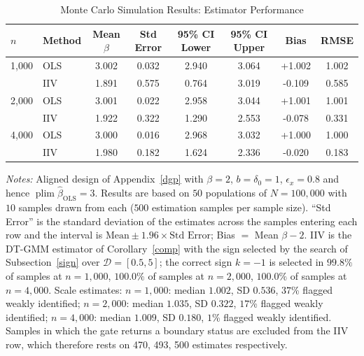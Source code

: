 \begin{table}[htbp]
\centering
\caption{Monte Carlo Simulation Results: Estimator Performance}
\label{tab:simulation_results}
\begin{threeparttable}
\begin{tabular}{llcccccc}
\toprule
\(n\) & Method & Mean \(\beta\) & Std Error & 95\% CI Lower & 95\% CI Upper & Bias & RMSE \\
\midrule
1{,}000 & OLS  & 3.002 & 0.032 & 2.940 & 3.064 & +1.002 & 1.002 \\
        & IIV  & 1.891 & 0.575 & 0.764 & 3.019 & -0.109 & 0.585 \\
\midrule
2{,}000 & OLS  & 3.001 & 0.022 & 2.958 & 3.044 & +1.001 & 1.001 \\
        & IIV  & 1.922 & 0.322 & 1.290 & 2.553 & -0.078 & 0.331 \\
\midrule
4{,}000 & OLS  & 3.000 & 0.016 & 2.968 & 3.032 & +1.000 & 1.000 \\
        & IIV  & 1.980 & 0.182 & 1.624 & 2.336 & -0.020 & 0.183 \\
\bottomrule
\end{tabular}
\begin{tablenotes}
\small
\item \textit{Notes:} Aligned design of Appendix~\ref{dgp} with
\(\beta=2\), \(b=\delta_0=1\), \(\epsilon_x=0.8\) and hence
\(\operatorname{plim}\widehat\beta_{\mathrm{OLS}}=3\). Results are based on
\(50\) populations of \(N=100{,}000\) with \(10\) samples drawn from each
(\(500\) estimation samples per sample size). ``Std Error'' is the standard
deviation of the estimates across the samples entering each row and the
interval is \(\text{Mean}\pm1.96\times\text{Std Error}\); Bias \(=\)
Mean \(\beta-2\). IIV is the DT-GMM estimator of Corollary~\ref{comp}
with the sign selected by the search of Subsection~\ref{sign} over
\(\mathcal D=[0.5,5]\); the correct sign \(k=-1\) is selected in \(99.8\%\) of samples at \(n=1{,}000\), \(100.0\%\) of samples at \(n=2{,}000\), \(100.0\%\) of samples at \(n=4{,}000\). Scale estimates: \(n=1{,}000\): median \(1.002\), SD \(0.536\), \(37\)\% flagged weakly identified; \(n=2{,}000\): median \(1.035\), SD \(0.322\), \(17\)\% flagged weakly identified; \(n=4{,}000\): median \(1.009\), SD \(0.180\), \(1\)\% flagged weakly identified. Samples in which the
gate returns a boundary status are excluded from the IIV row, which
therefore rests on 470, 493, 500 estimates respectively.
\end{tablenotes}
\end{threeparttable}
\end{table}
